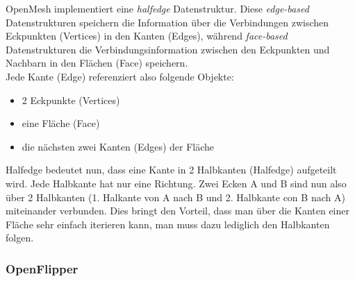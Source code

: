 OpenMesh implementiert eine \emph{halfedge} Datenstruktur.
Diese \emph{edge-based} Datenstrukturen speichern die Information über die Verbindungen zwischen Eckpunkten (Vertices) in den Kanten (Edges), während
\emph{face-based} Datenstrukturen die Verbindungsinformation zwischen den Eckpunkten und Nachbarn in den Flächen (Face) speichern.\\
Jede Kante (Edge) referenziert also folgende Objekte:
\begin{itemize}
	\item 2 Eckpunkte (Vertices)
	\item eine Fläche (Face)
	\item die nächsten zwei Kanten (Edges) der Fläche
\end{itemize}

Halfedge bedeutet nun, dass eine Kante in 2 Halbkanten (Halfedge) aufgeteilt wird. Jede Halbkante hat nur eine Richtung.
Zwei Ecken A und B sind nun also über 2 Halbkanten (1. Halkante von A nach B und 2. Halbkante con B nach A) miteinander verbunden.
Dies bringt den Vorteil, dass man über die Kanten einer Fläche sehr einfach iterieren kann, man muss dazu lediglich den Halbkanten folgen.


\subsubsection*{OpenFlipper}

